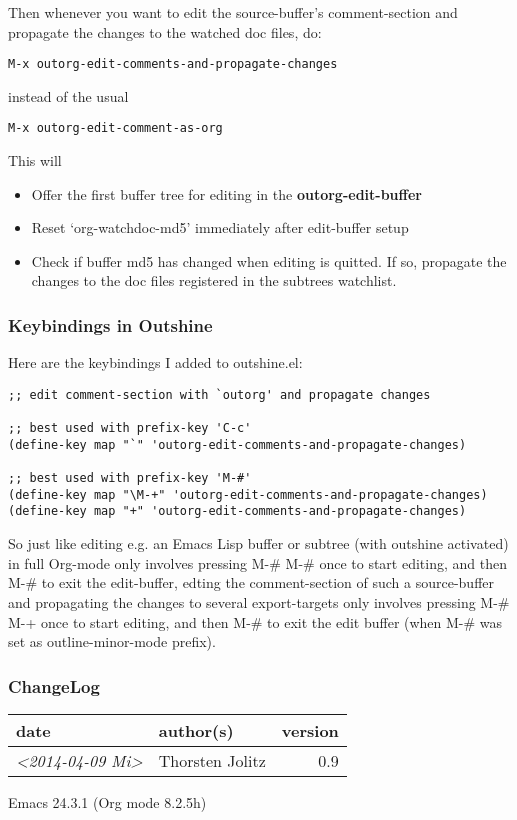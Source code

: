 \documentclass[11pt]{article}
\begin{document}
Then whenever you want to edit the source-buffer's
comment-section and propagate the changes to the watched doc
files, do:

\begin{verbatim}
M-x outorg-edit-comments-and-propagate-changes
\end{verbatim}

instead of the usual 

\begin{verbatim}
M-x outorg-edit-comment-as-org
\end{verbatim}

This will

\begin{itemize}
\item Offer the first buffer tree for editing in the
\textbf{outorg-edit-buffer}

\item Reset `org-watchdoc-md5' immediately after edit-buffer setup

\item Check if buffer md5 has changed when editing is quitted. If so,
propagate the changes to the doc files registered in the subtrees
watchlist.
\end{itemize}
\subsubsection{Keybindings in Outshine}
\label{sec-1-4-4}

Here are the keybindings I added to outshine.el:

\begin{verbatim}
;; edit comment-section with `outorg' and propagate changes

;; best used with prefix-key 'C-c' 
(define-key map "`" 'outorg-edit-comments-and-propagate-changes)

;; best used with prefix-key 'M-#'
(define-key map "\M-+" 'outorg-edit-comments-and-propagate-changes)
(define-key map "+" 'outorg-edit-comments-and-propagate-changes)
\end{verbatim}

So just like editing e.g. an Emacs Lisp buffer or subtree (with
outshine activated) in full Org-mode only involves pressing M-\# M-\#
once to start editing, and then M-\# to exit the edit-buffer, edting
the comment-section of such a source-buffer and propagating the
changes to several export-targets only involves pressing M-\# M-+ once
to start editing, and then M-\# to exit the edit buffer (when M-\# was
set as outline-minor-mode prefix). 
\subsubsection{ChangeLog}
\label{sec-1-4-5}

\begin{center}
\begin{tabular}{llr}
date & author(s) & version\\
\hline
\textit{<2014-04-09 Mi>} & Thorsten Jolitz & 0.9\\
\end{tabular}
\end{center}
Emacs 24.3.1 (Org mode 8.2.5h)
\end{document}
